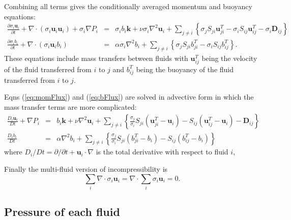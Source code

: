 \documentclass[draft]{agujournal2019}
\begin{document}
Combining all terms gives the conditionally averaged momentum and buoyancy equations:
\begin{eqnarray}
\frac{\partial\sigma_i\mathbf{u}_{i}}{\partial t} + 
\nabla\cdot(\sigma_i \mathbf{u}_{i} \mathbf{u}_{i})
+ \sigma_i \nabla P_{i}
& = &
\sigma_i b_{i}\mathbf{k}
+
\nu\sigma_i\nabla^{2}\mathbf{u}_{i}
+
\sum_{j\ne i}\left\{
     \sigma_{j} S_{ji}\mathbf{u}_{ji}^{T}
   - \sigma_{i} S_{ij}\mathbf{u}_{ij}^{T}
   - \sigma_{i}\mathbf{D}_{ij}\right\}
\label{eq:momFlux}\\
\frac{\partial\sigma_i b_{i}}{\partial t} + 
\nabla\cdot(\sigma_i \mathbf{u}_{i} b_{i})
& = &
\alpha\sigma_i\nabla^{2}b_{i}
+
\sum_{j\ne i}\left\{
    \sigma_{j} S_{ji} b_{ji}^{T}
  - \sigma_{i} S_{ij} b_{ij}^{T}
\right\}.
\label{eq:bFlux}
\end{eqnarray}
These equations include mass transfers between fluids with $\mathbf{u}_{ij}^T$ being the velocity of the fluid transferred from $i$ to $j$ and $b_{ij}^T$ being the buoyancy of the fluid transferred from $i$ to $j$. 

Eqns (\ref{eq:momFlux}) and (\ref{eq:bFlux}) are solved in advective form in which the mass transfer terms are more complicated: 
\begin{eqnarray}
\frac{D_{i}\mathbf{u}_{i}}{Dt}+\nabla P_{i}
& = &
b_{i}\mathbf{k}+\nu\nabla^{2}\mathbf{u}_{i}+\sum_{j\ne i}\left\{ \frac{\sigma_{j}}{\sigma_{i}}S_{ji}\left(\mathbf{u}_{ji}^{T}-\mathbf{u}_{i}\right)-S_{ij}(\mathbf{u}_{ij}^{T}-\mathbf{u}_{i})-\mathbf{D}_{ij}\right\}
\label{eq:mom}\\
\frac{D_{i}b_{i}}{Dt}
& = &
\alpha\nabla^{2}b_{i}+\sum_{j\ne i}\left\{ \frac{\sigma_{j}}{\sigma_{i}}S_{ji}\left(b_{ji}^{T}-b_{i}\right)-S_{ij}\left(b_{ij}^{T}-b_{i}\right)\right\} \label{eq:b}
\end{eqnarray}
where $D_{i}\big/Dt=\partial/\partial t+\mathbf{u}_{i}\cdot\nabla$ is the total derivative with respect to fluid $i$, 

Finally the multi-fluid version of incompressibility is
\begin{equation}
\sum_{i}\nabla\cdot\sigma_{i}\mathbf{u}_{i}  = \nabla\cdot\sum_{i}\sigma_{i}\mathbf{u}_{i}=0.
\label{eq:divFree}
\end{equation}

\subsection{Pressure of each fluid \label{subsec:fluidPressure}}
\end{document}
